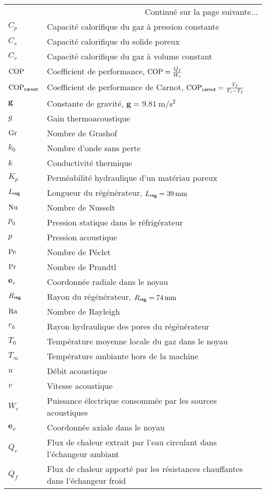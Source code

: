 \begin{center}
\begin{longtable}{p{} p{}}
		\hline
		\multicolumn{2}{r}{Continué sur la page suivante...} \endfoot
        \hline \endlastfoot
        $c_0$ & Célérité du son dans le milieu \\
        $C_p$ & Capacité calorifique du gaz à pression constante \\
        $C_s$ & Capacité calorifique du solide poreux \\
        $C_v$ & Capacité calorifique du gaz à volume constant \\
        $\mathrm{COP}$ & Coefficient de performance, $\mathrm{COP}=\frac{Q_f}{W_e}$ \\
        $\mathrm{COP}_{\sf carnot}$ & Coefficient de performance de Carnot, $\mathrm{COP}_{\sf carnot} = \frac{T_f}{T_c-T_f}$ \\
        $\mathbf{g}$ & Constante de gravité, $\mathbf{g}=\qty{9.81}{\meter\per\second\squared}$ \\
        $g$ & Gain thermoacoustique \\
        $\mathrm{Gr}$ & Nombre de Grashof \\
        $k_0$ & Nombre d'onde sans perte \\
        $k$ & Conductivité thermique \\
        $K_p$ & Perméabilité hydraulique d'un matériau poreux \\
        $L_{\sf reg}$ & Longueur du régénérateur, $L_{\sf reg}=\qty{39}{\milli\meter}$ \\
        $\mathrm{Nu}$ & Nombre de Nusselt \\
        $p_0$ & Pression statique dans le réfrigérateur \\
        $p$ & Pression acoustique \\
        $\mathrm{Pe}$ & Nombre de Péclet \\
        $\mathrm{Pr}$ & Nombre de Prandtl \\
        $\mathbf{e}_r$ & Coordonnée radiale dans le noyau \\
        $R_{\sf reg}$ & Rayon du régénérateur, $R_{\sf reg}=\qty{74}{\milli\meter}$ \\
        $\mathrm{Ra}$ & Nombre de Rayleigh \\
        $r_h$ & Rayon hydraulique des pores du régénérateur \\
        $T_0$ & Température moyenne locale du gaz dans le noyau \\
        $T_\infty$ & Température ambiante hors de la machine \\
        $u$ & Débit acoustique \\
        $v$ & Vitesse acoustique \\
        $W_e$ & Puissance électrique consommée par les sources acoustiques \\
        $\mathbf{e}_x$ & Coordonnée axiale dans le noyau \\
        $Q_c$ & Flux de chaleur extrait par l'eau circulant dans l'échangeur ambiant \\
        $Q_f$ & Flux de chaleur apporté par les résistances chauffantes dans l'échangeur froid\\
    \end{longtable}


\end{center}
